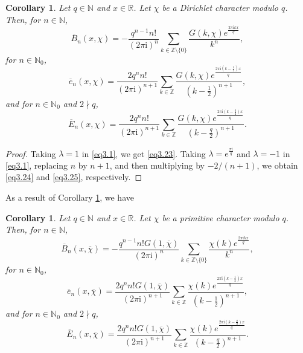 \documentclass[reqno]{amsart}
\numberwithin{equation}{section}
\newtheorem{corollary}[thm]{Corollary}
\begin{document}
\begin{corollary}\label{cor3.3} Let $q\in\mathbb{N}$ and $x\in\mathbb{R}$. Let $\chi$ be a Dirichlet character modulo $q$. Then, for $n\in\mathbb{N}$,
\begin{equation}\label{eq3.23}
\overline{B}_{n}(x,\chi)=-\frac{q^{n-1}n!}{(2\pi \mathrm{i})^{n}}\sum_{k\in\mathbb{Z}\setminus\{0\}}\frac{G(k,\chi)e^{\frac{2\pi\mathrm{i}kx}{q}}}{k^{n}},
\end{equation}
for $n\in\mathbb{N}_{0}$,
\begin{equation}\label{eq3.24}
\overline{e}_{n}(x,\chi)=\frac{2q^{n}n!}{(2\pi \mathrm{i})^{n+1}}\sum_{k\in\mathbb{Z}}\frac{G(k,\chi)e^{\frac{2\pi\mathrm{i}(k-\frac{1}{2})x}{q}}}{(k-\frac{1}{2})^{n+1}},
\end{equation}
and for $n\in\mathbb{N}_{0}$ and $2\nmid q$,
\begin{equation}\label{eq3.25}
\overline{E}_{n}(x,\chi)=\frac{2q^{n}n!}{(2\pi \mathrm{i})^{n+1}}\sum_{k\in\mathbb{Z}}\frac{G(k,\chi)e^{\frac{2\pi\mathrm{i}(k-\frac{q}{2})x}{q}}}{(k-\frac{q}{2})^{n+1}}.
\end{equation}
\end{corollary}

\begin{proof}
Taking $\lambda=1$ in \eqref{eq3.1}, we get \eqref{eq3.23}. Taking $\lambda=e^{\frac{\pi\mathrm{i}}{q}}$ and $\lambda=-1$ in \eqref{eq3.1}, replacing $n$ by $n+1$, and then multiplying by
$-2/(n+1)$, we obtain \eqref{eq3.24} and \eqref{eq3.25}, respectively.
\end{proof}

As a result of Corollary \ref{cor3.3}, we have

\begin{corollary}\label{cor3.4} Let $q\in\mathbb{N}$ and $x\in\mathbb{R}$. Let $\chi$ be a primitive character modulo $q$. Then, for $n\in\mathbb{N}$,
\begin{equation}\label{eq3.26}
\overline{B}_{n}(x,\overline{\chi})=-\frac{q^{n-1}n!G(1,\overline{\chi})}{(2\pi \mathrm{i})^{n}}\sum_{k\in\mathbb{Z}\setminus\{0\}}\frac{\chi(k)e^{\frac{2\pi\mathrm{i}kx}{q}}}{k^{n}},
\end{equation}
for $n\in\mathbb{N}_{0}$,
\begin{equation}\label{eq3.27}
\overline{e}_{n}(x,\overline{\chi})=\frac{2q^{n}n!G(1,\overline{\chi})}{(2\pi \mathrm{i})^{n+1}}\sum_{k\in\mathbb{Z}}\frac{\chi(k)e^{\frac{2\pi\mathrm{i}(k-\frac{1}{2})x}{q}}}{(k-\frac{1}{2})^{n+1}},
\end{equation}
and for $n\in\mathbb{N}_{0}$ and $2\nmid q$,
\begin{equation}\label{eq3.28}
\overline{E}_{n}(x,\overline{\chi})=\frac{2q^{n}n!G(1,\overline{\chi})}{(2\pi \mathrm{i})^{n+1}}\sum_{k\in\mathbb{Z}}\frac{\chi(k)e^{\frac{2\pi\mathrm{i}(k-\frac{q}{2})x}{q}}}{(k-\frac{q}{2})^{n+1}}.
\end{equation}
\end{corollary}
\end{document}
